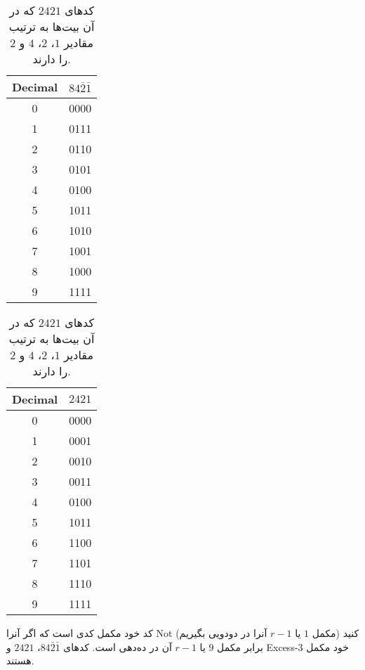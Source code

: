 \documentclass[a5paper]{article}
\begin{document}
\begin{table}[ht]
  \begin{minipage}[t]{.45\linewidth}\centering
    \begin{tabular}{c c}
      Decimal & $84\bar{2}\bar{1}$ \\
      \hline
      0 & 0000\\
      1 & 0111\\
      2 & 0110\\
      3 & 0101\\
      4 & 0100\\
      5 & 1011\\
      6 & 1010\\
      7 & 1001\\
      8 & 1000\\
      9 & 1111\\
    \end{tabular}
    \caption{کدهای $8 4 \bar{2} \bar{1}$ که در آن بیت‌ها به ترتیب مقادیر $-1$، $-2$، $4$ و $8$ را دارند.}
  \end{minipage}
  \hfill
  \begin{minipage}[t]{.45\linewidth}\centering
    \begin{tabular}{c c}
      Decimal & $2421$ \\
      \hline
      0 & 0000\\
      1 & 0001\\
      2 & 0010\\
      3 & 0011\\
      4 & 0100\\
      5 & 1011\\
      6 & 1100\\
      7 & 1101\\
      8 & 1110\\
      9 & 1111\\
    \end{tabular}
    \caption{کدهای $2 4 2 1$ که در آن بیت‌ها به ترتیب مقادیر $1$، $2$، $4$ و $2$ را دارند.}
  \end{minipage}
\end{table}

کد خود مکمل کدی است که اگر آنرا Not کنید (مکمل $1$ یا $r-1$ آنرا در دودویی بگیریم)
برابر مکمل $9$ یا $r-1$ آن در ده‌دهی است. کدهای $84\bar{2}\bar{1}$، $2421$ و Excess-3 خود مکمل هستند.


\end{document}
